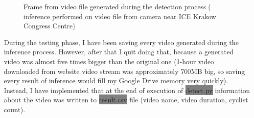 \begin{figure} [h]
    \centering
    \caption{Frame from video file generated during the detection process ( inference performed on video file from camera near ICE Krakow Congress Centre)}
    \label{fig:inference5}
\end{figure}
During the testing phase, I have been saving every video generated during the inference process. However, after that I quit doing that, because a generated video was almost five times bigger than the original one (1-hour video downloaded from website video stream was approximately 700MB big, so saving every result of inference would fill my Google Drive memory very quickly). Instead, I have implemented that at the end of execution of \colorbox{Gray}{detect.py} information about the video was written to \colorbox{Gray}{result.csv} file (video name, video duration, cyclist count).